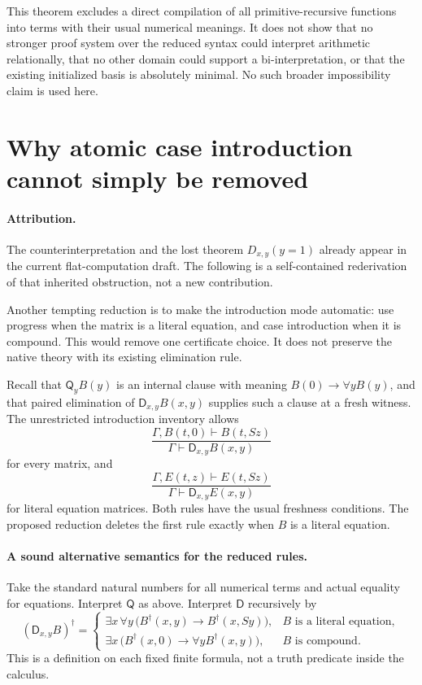\documentclass[11pt,letterpaper]{article}
\theoremstyle{definition}\newtheorem{definition}[theorem]{Definition}
\theoremstyle{remark}\newtheorem{remark}[theorem]{Remark}
\begin{document}
This theorem excludes a direct compilation of all primitive-recursive
functions into terms with their usual numerical meanings.  It does not
show that no stronger proof system over the reduced syntax could
interpret arithmetic relationally, that no other domain could support a
bi-interpretation, or that the existing initialized basis is absolutely
minimal.  No such broader impossibility claim is used here.

\section{Why atomic case introduction cannot simply be removed}
\label{app:forced-progress-obstruction}

\paragraph{Attribution.} The counterinterpretation and the lost theorem $D_{x,y}(y=1)$ already appear in the current flat-computation draft. The following is a self-contained rederivation of that inherited obstruction, not a new contribution.~\cite{flat}

Another tempting reduction is to make the introduction mode automatic:
use progress when the matrix is a literal equation, and case introduction
when it is compound.  This would remove one certificate choice.  It does
not preserve the native theory with its existing elimination rule.

Recall that $\mathsf Q_yB(y)$ is an internal clause with meaning
$B(0)\to\forall yB(y)$, and that paired elimination of
$\mathsf D_{x,y}B(x,y)$ supplies such a clause at a fresh witness.
The unrestricted introduction inventory allows
\[
 \frac{\Gamma,B(t,0)\vdash B(t,Sz)}
      {\Gamma\vdash\mathsf D_{x,y}B(x,y)}
\]
for every matrix, and
\[
 \frac{\Gamma,E(t,z)\vdash E(t,Sz)}
      {\Gamma\vdash\mathsf D_{x,y}E(x,y)}
\]
for literal equation matrices.  Both rules have the usual freshness
conditions.  The proposed reduction deletes the first rule exactly when
$B$ is a literal equation.

\paragraph{A sound alternative semantics for the reduced rules.}
Take the standard natural numbers for all numerical terms and actual
equality for equations.  Interpret $\mathsf Q$ as above.  Interpret
$\mathsf D$ recursively by
\[
 (\mathsf D_{x,y}B)^\dagger=
 \begin{cases}
 \exists x\,\forall y\,
   \bigl(B^\dagger(x,y)\to B^\dagger(x,Sy)\bigr),
       & B\text{ is a literal equation},\\[2pt]
 \exists x\,
   \bigl(B^\dagger(x,0)\to\forall yB^\dagger(x,y)\bigr),
       & B\text{ is compound}.
 \end{cases}
\]
This is a definition on each fixed finite formula, not a truth predicate
inside the calculus.
\end{document}
